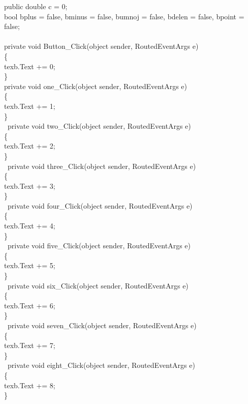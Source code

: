         public double c = 0;\\
        bool bplus = false, bminus = false, bumnoj = false, bdelen = false, bpoint = false;\\
\\
        private void Button\_Click(object sender, RoutedEventArgs e)\\
        \{\\
            texb.Text += 0;\\
        \}\\

        private void one\_Click(object sender, RoutedEventArgs e)\\
        \{\\
            texb.Text += 1;\\
        \}\\
\
        private void two\_Click(object sender, RoutedEventArgs e)\\
        \{\\
            texb.Text += 2;\\
        \}\\
\
        private void three\_Click(object sender, RoutedEventArgs e)\\
        \{\\
            texb.Text += 3;\\
        \}\\
\
        private void four\_Click(object sender, RoutedEventArgs e)\\
        \{\\
            texb.Text += 4;\\
        \}\\
\
        private void five\_Click(object sender, RoutedEventArgs e)\\
        \{\\
            texb.Text += 5;\\
        \}\\
\
        private void six\_Click(object sender, RoutedEventArgs e)\\
        \{\\
            texb.Text += 6;\\
        \}\\
\
        private void seven\_Click(object sender, RoutedEventArgs e)\\
        \{\\
            texb.Text += 7;\\
        \}\\
\
        private void eight\_Click(object sender, RoutedEventArgs e)\\
        \{\\
            texb.Text += 8;\\
        \}\\

